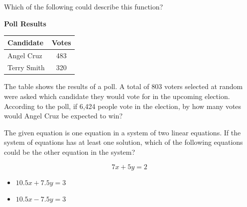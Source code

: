 Which of the following could describe this function?

\vspace{0.75em}


\vspace{2em}
\noindent\markforreview
\begin{center}
    

\textbf{Poll Results}

\vspace{0.4em}
\begin{tabular}{|l|c|}
\hline
Candidate & Votes \\
\hline
Angel Cruz & 483 \\
Terry Smith & 320 \\
\hline
\end{tabular}
\end{center}

\vspace{1em}

The table shows the results of a poll. A total of 803 voters selected at random were asked which candidate they would vote for in the upcoming election.  
According to the poll, if 6,424 people vote in the election, by how many votes would Angel Cruz be expected to win?

\vspace{0.75em}


\vspace{2em}
\newpage
\noindent\markforreview
\vspace{1em}

The given equation is one equation in a system of two linear equations.  
If the system of equations has at least one solution, which of the following equations could be the other equation in the system?

\[
7x + 5y = 2
\]

\begin{itemize}
    \item[I.] \(10.5x + 7.5y = 3\)
    \item[II.] \(10.5x - 7.5y = 3\)
\end{itemize}



